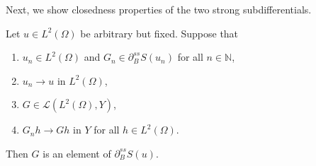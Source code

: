\documentclass[reqno]{shinyart}
\begin{document}
Next, we show closedness properties of the two strong subdifferentials.
\begin{proposition}\label{prop:stabss}
    Let $u \in L^2(\Omega)$ be arbitrary but fixed. Suppose that
    \begin{enumerate}[label=(\roman*)]
        \item $u_n \in L^2(\Omega)$ and  $G_n \in \partial_{B}^{ss} S(u_n)$ for all $n\in {\mathbb{N}}$,
        \item $u_n \to u$ in $L^2(\Omega)$,
        \item $G \in \mathcal{L}(L^2(\Omega), Y)$,
        \item $G_n h  \to G h$ in $Y$ for all $h \in L^2(\Omega)$.
    \end{enumerate}
    Then $G$ is an element of $\partial_{B}^{ss} S(u)$.
\end{proposition}
\end{document}
